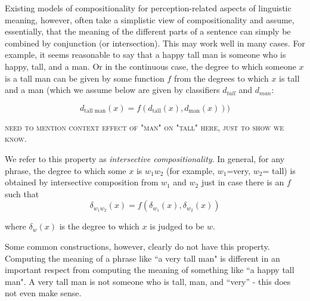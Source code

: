 \documentclass[11pt,a4paper]{article}
\newcommand{\comment}[1]{{\footnotesize\textsc{#1}}}
\begin{document}

Existing models of compositionality for perception-related aspects of linguistic meaning, however, often take a simplistic view of compositionality and assume, essentially, that the meaning of the different parts of a sentence can %
simply be combined by conjunction (or intersection). This may work well in many cases. For example, it seems reasonable to say that a happy tall man is someone who is happy, tall, and a man. Or in the continuous case, the degree to which someone $x$ is a %
tall man can be given by some function $f$ from the degrees to which $x$ is %
tall and a man (which we assume below are given by  classifiers %
$d_{tall}$ and $d_{man}$:


\[d_{\textrm{tall man}}(x) = f( d_\textrm{tall}(x), d_\textrm{man}(x)))\]

\comment{need to mention context effect of "man" on "tall" here, just to show we know.}

We refer to this property as \emph{intersective compositionality}. In general, for any phrase, %
the degree to which some $x$ is $w_1 w_2$ (for example, $w_1$=very, $w_2$= tall) is obtained by intersective composition from $w_1$ and $w_2$ just in case there is an $f$ such that \[\delta_{w_1 w_2}(x) = f(\delta_{w_1}(x), \delta_{w_2}(x))\]

where $\delta_w(x)$ is the degree to which $x$ is judged to be $w$.


Some common constructions, however, clearly do not have this property. Computing the meaning of a phrase like ``a very tall man" is different in an important respect from computing the meaning of something like ``a happy tall man".  A very tall man is not someone who is tall, man, and ``very'' - this does not even make sense.
\end{document}
